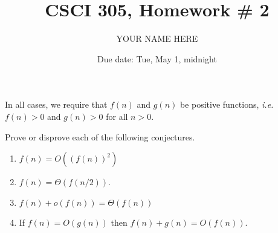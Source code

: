 \documentclass{article}
\title{CSCI 305, Homework \# 2}
\author{YOUR NAME HERE}
\date{Due date:  Tue, May 1, midnight}
\begin{document}
\maketitle

In all cases,
we require that $f(n)$ and $g(n)$ be positive functions,
{\em i.e.} $f(n) > 0$ and $g(n) > 0$ for all $n > 0$.

Prove or disprove each of the following conjectures.


\begin{enumerate}
\item
  \(f(n) = O((f(n))^2)\)

\item
  $f(n) = \Theta(f(n/2))$.

\item
  $f(n) + o(f(n)) = \Theta(f(n))$

\item
  If $f(n) = O(g(n))$ then $f(n) + g(n) = O(f(n))$.

\end{enumerate}
\end{document}
